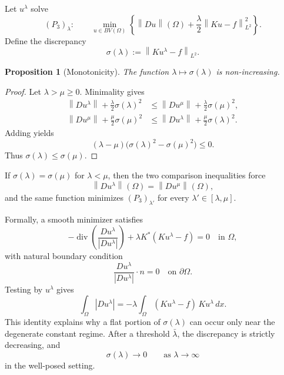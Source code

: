 \documentclass[11pt]{article}
\newcommand{\Om}{\Omega}
\newcommand{\Div}{\operatorname{div}}
\newcommand{\norm}[2][]{\left\lVert #2\right\rVert_{#1}}
\theoremstyle{definition}
\theoremstyle{plain}
\newtheorem{proposition}[definition]{Proposition}
\begin{document}
Let $u^\lambda$ solve
\[
(P_3)_\lambda:
\qquad
\min_{u\in BV(\Om)}
\left\{
\norm{Du}(\Om)+\frac{\lambda}{2}\norm[L^2]{Ku-f}^2
\right\}.
\]
Define the discrepancy
\[
\sigma(\lambda):=\norm[L^2]{Ku^\lambda-f}.
\]

\begin{proposition}[Monotonicity]
The function $\lambda\mapsto\sigma(\lambda)$ is non-increasing.
\end{proposition}

\begin{proof}
Let $\lambda>\mu\ge0$. Minimality gives
\begin{align*}
\norm{Du^\lambda}+\frac{\lambda}{2}\sigma(\lambda)^2
&\le \norm{Du^\mu}+\frac{\lambda}{2}\sigma(\mu)^2,\\
\norm{Du^\mu}+\frac{\mu}{2}\sigma(\mu)^2
&\le \norm{Du^\lambda}+\frac{\mu}{2}\sigma(\lambda)^2.
\end{align*}
Adding yields
\[
(\lambda-\mu)\bigl(\sigma(\lambda)^2-\sigma(\mu)^2\bigr)\le0.
\]
Thus $\sigma(\lambda)\le\sigma(\mu)$.
\end{proof}

If $\sigma(\lambda)=\sigma(\mu)$ for $\lambda<\mu$, then the two comparison inequalities force
\[
\norm{Du^\lambda}(\Om)=\norm{Du^\mu}(\Om),
\]
and the same function minimizes $(P_3)_{\lambda'}$ for every $\lambda'\in[\lambda,\mu]$.

Formally, a smooth minimizer satisfies
\[
-\Div\left(\frac{Du^\lambda}{|Du^\lambda|}\right)
+\lambda K^*(Ku^\lambda-f)=0
\quad\text{in }\Om,
\]
with natural boundary condition
\[
\frac{Du^\lambda}{|Du^\lambda|}\cdot n=0
\quad\text{on }\partial\Om.
\]
Testing by $u^\lambda$ gives
\[
\int_{\Om}|Du^\lambda|
=-\lambda\int_{\Om}(Ku^\lambda-f)\,Ku^\lambda\,dx.
\]
This identity explains why a flat portion of $\sigma(\lambda)$ can occur only near the degenerate constant regime. After a threshold $\bar\lambda$, the discrepancy is strictly decreasing, and
\[
\sigma(\lambda)\to0
\qquad\text{as }\lambda\to\infty
\]
in the well-posed setting.

\begin{center}
\end{center}
\end{document}
